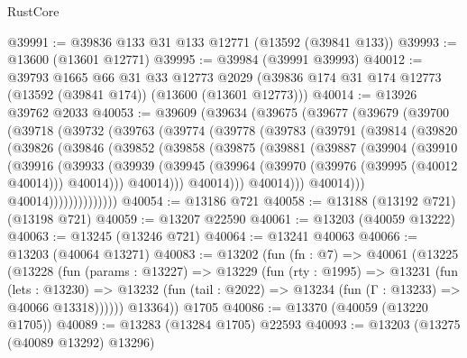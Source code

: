 \begin{lexlean}{RustCore}
\begin{coremodule}
@39991 := @39836 @133 @31 @133 @12771 (@13592 (@39841 @133))
@39993 := @13600 (@13601 @12771)
@39995 := @39984 (@39991 @39993)
@40012 := @39793
    @1665
    @66
    @31
    @33
    @12773
    @2029
    (@39836 @174 @31 @174 @12773 (@13592 (@39841 @174)) (@13600 (@13601 @12773)))
@40014 := @13926 @39762 @2033
@40053 := @39609
    (@39634
      (@39675
        (@39677
          (@39679
            (@39700
              (@39718
                (@39732
                  (@39763
                    (@39774
                      (@39778
                        (@39783
                          (@39791
                            (@39814
                              (@39820
                                (@39826
                                  (@39846
                                    (@39852
                                      (@39858
                                        (@39875
                                          (@39881
                                            (@39887
                                              (@39904
                                                (@39910
                                                  (@39916
                                                    (@39933
                                                      (@39939
                                                        (@39945
                                                          (@39964
                                                            (@39970
                                                              (@39976 (@39995 (@40012 @40014)))
                                                              @40014)))
                                                        @40014)))
                                                  @40014)))
                                            @40014)))
                                      @40014)))
                                @40014))))))))))))))
@40054 := @13186 @721
@40058 := @13188 (@13192 @721) (@13198 @721)
@40059 := @13207 @22590
@40061 := @13203 (@40059 @13222)
@40063 := @13245 (@13246 @721)
@40064 := @13241 @40063
@40066 := @13203 (@40064 @13271)
@40083 := @13202
    (fun (fn : @7) =>
    @40061
      (@13225
        (@13228
          (fun (params : @13227) =>
          @13229
            (fun (rty : @1995) =>
            @13231
              (fun (lets : @13230) =>
              @13232 (fun (tail : @2022) => @13234 (fun (Γ : @13233) => @40066 @13318))))))
        @13364))
    @1705
@40086 := @13370 (@40059 (@13220 @1705))
@40089 := @13283 (@13284 @1705) @22593
@40093 := @13203 (@13275 (@40089 @13292) @13296)

\end{coremodule}
\end{lexlean}
